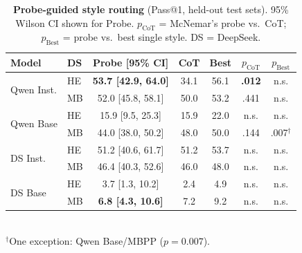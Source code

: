 \documentclass[11pt]{article}
\begin{document}
\begin{table}[t]
    \centering
    \caption{\textbf{Probe-guided style routing} (Pass@1, held-out test sets). 95\% Wilson CI shown for Probe. $p_{\text{CoT}}$ = McNemar's probe vs.\ CoT; $p_{\text{Best}}$ = probe vs.\ best single style. DS = DeepSeek.}
    \label{tab:strategy}
    \small
    \begin{tabular}{llccccc}
        \toprule
        \textbf{Model} & \textbf{DS} & \textbf{Probe [95\% CI]} & \textbf{CoT} & \textbf{Best} & $p_{\text{CoT}}$ & $p_{\text{Best}}$ \\
        \midrule
        \multirow{2}{*}{Qwen Inst.}
        & HE & \textbf{53.7 [42.9, 64.0]} & 34.1 & 56.1 & \textbf{.012} & n.s. \\
        & MB & 52.0 [45.8, 58.1] & 50.0 & 53.2 & .441 & n.s. \\
        \midrule
        \multirow{2}{*}{Qwen Base}
        & HE & 15.9 [9.5, 25.3]  & 15.9 & 22.0 & n.s. & n.s. \\
        & MB & 44.0 [38.0, 50.2] & 48.0 & 50.0 & .144 & .007$^\dagger$ \\
        \midrule
        \multirow{2}{*}{DS Inst.}
        & HE & 51.2 [40.6, 61.7] & 51.2 & 53.7 & n.s. & n.s. \\
        & MB & 46.4 [40.3, 52.6] & 46.0 & 48.0 & n.s. & n.s. \\
        \midrule
        \multirow{2}{*}{DS Base}
        & HE & 3.7 [1.3, 10.2]   & 2.4  & 4.9  & n.s. & n.s. \\
        & MB & \textbf{6.8 [4.3, 10.6]}  & 7.2  & 9.2  & n.s. & n.s. \\
        \bottomrule
    \end{tabular}
    \vspace{1mm}\\
    \small $^\dagger$One exception: Qwen Base/MBPP ($p{=}0.007$).
\end{table}
\end{document}
